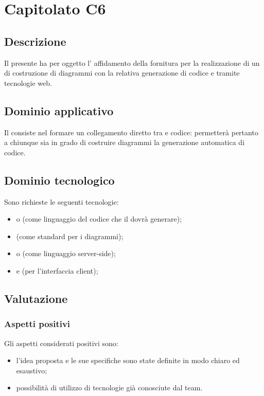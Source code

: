 \section {Capitolato C6}
	\subsection {Descrizione}
	Il presente  ha per oggetto l’ affidamento della fornitura per la realizzazione
di un  di costruzione di diagrammi  con la relativa generazione di codice
 e  tramite tecnologie web.
	\subsection {Dominio applicativo}
	Il  consiste nel formare un collegamento diretto tra  e codice: permetterà pertanto a chiunque sia in grado di costruire diagrammi  la generazione automatica di codice.
	\subsection {Dominio tecnologico}
	Sono richieste le seguenti tecnologie:
	\begin {itemize}
	\item \textbf{} o \textbf{} (come linguaggio del codice che il  dovrà generare);
	\item \textbf{} (come standard per i diagrammi);
	\item \textbf{} o \textbf{} (come linguaggio server-side);
	\item \textbf{} e \textbf{} (per l'interfaccia client);
	\end {itemize}
	\subsection {Valutazione}
		\subsubsection {Aspetti positivi}
		Gli aspetti considerati positivi sono:
			\begin {itemize}
			 	\item l'idea proposta e le sue specifiche sono state definite in modo chiaro ed esaustivo;
			 	\item possibilità di utilizzo di tecnologie già conosciute dal team.
			\end {itemize}
